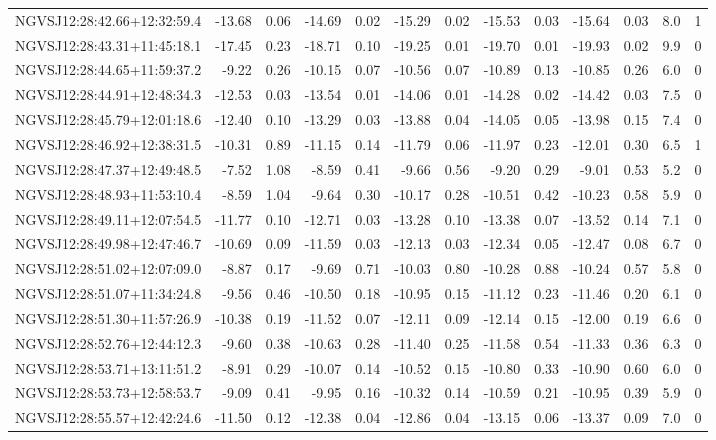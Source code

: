 \begin{tabular}{lrrrrrrrrrrcc}
NGVSJ12:28:42.66+12:32:59.4 & -13.68 & 0.06 & -14.69 & 0.02 & -15.29 & 0.02 & -15.53 & 0.03 & -15.64 & 0.03 & 8.0 & 1 \\
NGVSJ12:28:43.31+11:45:18.1 & -17.45 & 0.23 & -18.71 & 0.10 & -19.25 & 0.01 & -19.70 & 0.01 & -19.93 & 0.02 & 9.9 & 0 \\
NGVSJ12:28:44.65+11:59:37.2 & -9.22 & 0.26 & -10.15 & 0.07 & -10.56 & 0.07 & -10.89 & 0.13 & -10.85 & 0.26 & 6.0 & 0 \\
NGVSJ12:28:44.91+12:48:34.3 & -12.53 & 0.03 & -13.54 & 0.01 & -14.06 & 0.01 & -14.28 & 0.02 & -14.42 & 0.03 & 7.5 & 0 \\
NGVSJ12:28:45.79+12:01:18.6 & -12.40 & 0.10 & -13.29 & 0.03 & -13.88 & 0.04 & -14.05 & 0.05 & -13.98 & 0.15 & 7.4 & 0 \\
NGVSJ12:28:46.92+12:38:31.5 & -10.31 & 0.89 & -11.15 & 0.14 & -11.79 & 0.06 & -11.97 & 0.23 & -12.01 & 0.30 & 6.5 & 1 \\
NGVSJ12:28:47.37+12:49:48.5 & -7.52 & 1.08 & -8.59 & 0.41 & -9.66 & 0.56 & -9.20 & 0.29 & -9.01 & 0.53 & 5.2 & 0 \\
NGVSJ12:28:48.93+11:53:10.4 & -8.59 & 1.04 & -9.64 & 0.30 & -10.17 & 0.28 & -10.51 & 0.42 & -10.23 & 0.58 & 5.9 & 0 \\
NGVSJ12:28:49.11+12:07:54.5 & -11.77 & 0.10 & -12.71 & 0.03 & -13.28 & 0.10 & -13.38 & 0.07 & -13.52 & 0.14 & 7.1 & 0 \\
NGVSJ12:28:49.98+12:47:46.7 & -10.69 & 0.09 & -11.59 & 0.03 & -12.13 & 0.03 & -12.34 & 0.05 & -12.47 & 0.08 & 6.7 & 0 \\
NGVSJ12:28:51.02+12:07:09.0 & -8.87 & 0.17 & -9.69 & 0.71 & -10.03 & 0.80 & -10.28 & 0.88 & -10.24 & 0.57 & 5.8 & 0 \\
NGVSJ12:28:51.07+11:34:24.8 & -9.56 & 0.46 & -10.50 & 0.18 & -10.95 & 0.15 & -11.12 & 0.23 & -11.46 & 0.20 & 6.1 & 0 \\
NGVSJ12:28:51.30+11:57:26.9 & -10.38 & 0.19 & -11.52 & 0.07 & -12.11 & 0.09 & -12.14 & 0.15 & -12.00 & 0.19 & 6.6 & 0 \\
NGVSJ12:28:52.76+12:44:12.3 & -9.60 & 0.38 & -10.63 & 0.28 & -11.40 & 0.25 & -11.58 & 0.54 & -11.33 & 0.36 & 6.3 & 0 \\
NGVSJ12:28:53.71+13:11:51.2 & -8.91 & 0.29 & -10.07 & 0.14 & -10.52 & 0.15 & -10.80 & 0.33 & -10.90 & 0.60 & 6.0 & 0 \\
NGVSJ12:28:53.73+12:58:53.7 & -9.09 & 0.41 & -9.95 & 0.16 & -10.32 & 0.14 & -10.59 & 0.21 & -10.95 & 0.39 & 5.9 & 0 \\
NGVSJ12:28:55.57+12:42:24.6 & -11.50 & 0.12 & -12.38 & 0.04 & -12.86 & 0.04 & -13.15 & 0.06 & -13.37 & 0.09 & 7.0 & 0 \\

\end{tabular}
